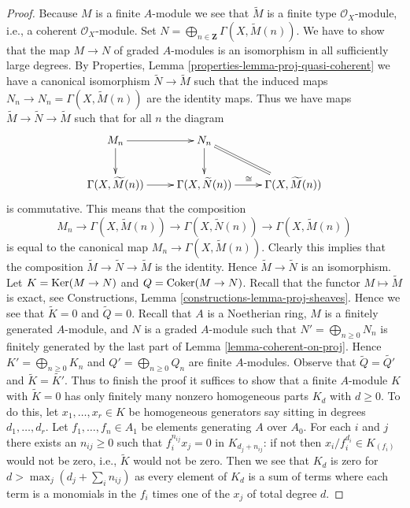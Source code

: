 \begin{proof}
Because $M$ is a finite $A$-module we see that
$\widetilde{M}$ is a finite type $\mathcal{O}_X$-module,
i.e., a coherent $\mathcal{O}_X$-module.
Set $N = \bigoplus_{n \in \mathbf{Z}} \Gamma(X, \widetilde{M}(n))$.
We have to show that the map $M \to N$ of graded $A$-modules
is an isomorphism in all sufficiently large degrees.
By Properties, Lemma \ref{properties-lemma-proj-quasi-coherent}
we have a canonical isomorphism $\widetilde{N} \to \widetilde{M}$
such that the induced maps $N_n \to N_n = \Gamma(X, \widetilde{M}(n))$
are the identity maps. Thus we have maps
$\widetilde{M} \to \widetilde{N} \to \widetilde{M}$
such that for all $n$ the diagram
$$
\xymatrix{
M_n \ar[d] \ar[r] & N_n \ar[d] \ar@{=}[rd] \\
\Gamma(X, \widetilde{M}(n)) \ar[r] &
\Gamma(X, \widetilde{N}(n)) \ar[r]^{\cong} &
\Gamma(X, \widetilde{M}(n))
}
$$
is commutative. This means that the composition
$$
M_n \to \Gamma(X, \widetilde{M}(n))
\to \Gamma(X, \widetilde{N}(n)) \to \Gamma(X, \widetilde{M}(n))
$$
is equal to the canonical map $M_n \to \Gamma(X, \widetilde{M}(n))$.
Clearly this implies that the composition
$\widetilde{M} \to \widetilde{N} \to \widetilde{M}$
is the identity. Hence $\widetilde{M} \to \widetilde{N}$ is an isomorphism.
Let $K = \mathop{\mathrm{Ker}}(M \to N)$ and $Q = \mathop{\mathrm{Coker}}(M \to N)$.
Recall that the functor $M \mapsto \widetilde{M}$ is exact, see
Constructions, Lemma \ref{constructions-lemma-proj-sheaves}.
Hence we see that $\widetilde{K} = 0$ and $\widetilde{Q} = 0$.
Recall that $A$ is a Noetherian ring, $M$ is a finitely generated
$A$-module, and $N$ is a graded $A$-module such that
$N' = \bigoplus_{n \geq 0} N_n$ is finitely generated by
the last part of Lemma \ref{lemma-coherent-on-proj}.
Hence $K' = \bigoplus_{n \geq 0} K_n$ and
$Q' = \bigoplus_{n \geq 0} Q_n$ are finite $A$-modules.
Observe that $\widetilde{Q} = \widetilde{Q'}$ and
$\widetilde{K} = \widetilde{K'}$.
Thus to finish the proof it suffices to show
that a finite $A$-module $K$ with $\widetilde{K} = 0$
has only finitely many nonzero homogeneous parts $K_d$ with $d \geq 0$.
To do this, let $x_1, \ldots, x_r \in K$ be homogeneous generators
say sitting in degrees $d_1, \ldots, d_r$.
Let $f_1, \ldots, f_n \in A_1$ be elements generating $A$ over $A_0$.
For each $i$ and $j$ there exists an $n_{ij} \geq 0$ such that
$f_i^{n_{ij}} x_j = 0$ in $K_{d_j + n_{ij}}$: if not then
$x_i/f_i^{d_i} \in K_{(f_i)}$ would not be zero, i.e., $\widetilde{K}$
would not be zero.
Then we see that $K_d$ is zero for $d > \max_j(d_j + \sum_i n_{ij})$
as every element of $K_d$ is a sum of terms where each term is a
monomials in the $f_i$ times one of the $x_j$ of total degree $d$.
\end{proof}

